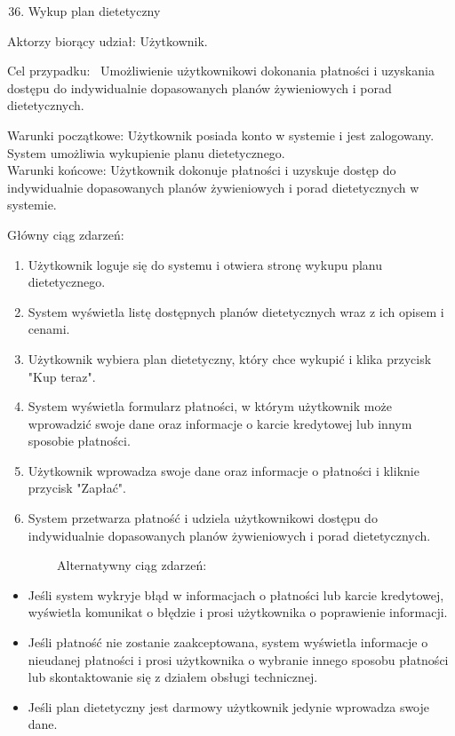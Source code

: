\documentclass[
]{article}
\providecommand{\tightlist}{%
  \setlength{\itemsep}{0pt}\setlength{\parskip}{0pt}}
\begin{document}
\begin{enumerate}
\setcounter{enumi}{35}
\tightlist
\item
  {Wykup plan dietetyczny}
\end{enumerate}

{Aktorzy biorący udział: Użytkownik.}

{Cel przypadku: ~Umożliwienie użytkownikowi dokonania płatności i
uzyskania dostępu do indywidualnie dopasowanych planów żywieniowych i
porad dietetycznych.}

{Warunki początkowe: Użytkownik posiada konto w systemie i jest
zalogowany. System umożliwia wykupienie planu dietetycznego.\\
Warunki końcowe: Użytkownik dokonuje płatności i uzyskuje dostęp do
indywidualnie dopasowanych planów żywieniowych i porad dietetycznych w
systemie.}

{Główny ciąg zdarzeń:}

\begin{enumerate}
\tightlist
\item
  {Użytkownik loguje się do systemu i otwiera stronę wykupu planu
  dietetycznego.}
\item
  {System wyświetla listę dostępnych planów dietetycznych wraz z ich
  opisem i cenami.}
\item
  {Użytkownik wybiera plan dietetyczny, który chce wykupić i klika
  przycisk "Kup teraz".}
\item
  {System wyświetla formularz płatności, w którym użytkownik może
  wprowadzić swoje dane oraz informacje o karcie kredytowej lub innym
  sposobie płatności.}
\item
  {Użytkownik wprowadza swoje dane oraz informacje o płatności i kliknie
  przycisk "Zapłać".}
\item
  {System przetwarza płatność i udziela użytkownikowi dostępu do
  indywidualnie dopasowanych planów żywieniowych i porad dietetycznych.}
\end{enumerate}

{~~~~~~~~Alternatywny ciąg zdarzeń:}

\begin{itemize}
\tightlist
\item
  {Jeśli system wykryje błąd w informacjach o płatności lub karcie
  kredytowej, wyświetla komunikat o błędzie i prosi użytkownika o
  poprawienie informacji.}
\item
  {Jeśli płatność nie zostanie zaakceptowana, system wyświetla
  informacje o nieudanej płatności i prosi użytkownika o wybranie innego
  sposobu płatności lub skontaktowanie się z działem obsługi
  technicznej.}
\item
  {Jeśli plan dietetyczny jest darmowy użytkownik jedynie wprowadza
  swoje dane.}
\end{itemize}
\end{document}
